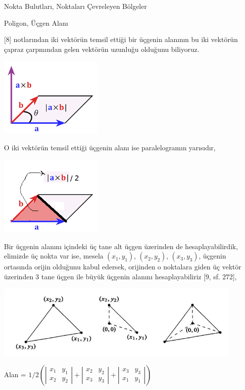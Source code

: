 \documentclass[12pt,fleqn]{article}\usepackage{../../common}
\begin{document}
Nokta Bulutları, Noktaları Çevreleyen Bölgeler

Poligon, Üçgen Alanı

[8] notlarından iki vektörün temsil ettiği bir üçgenin alanının bu iki vektörün
çapraz çarpmından gelen vektörün uzunluğu olduğunu biliyoruz. 

\includegraphics[width=5cm]{triar4.png}

O iki vektörün temsil ettiği üçgenin alanı ise paralelogramın yarısıdır,

\includegraphics[width=5cm]{triar3.png}

Bir üçgenin alanını içindeki üç tane alt üçgen üzerinden de hesaplayabilirdik,
elimizde üç nokta var ise, mesela $(x_1,y_1)$, $(x_2,y_2)$, $(x_3,y_3)$, üçgenin
ortasında orijin olduğunu kabul edersek, orijinden o noktalara giden üç vektör
üzerinden 3 tane üçgen ile büyük üçgenin alanını hesaplayabiliriz [9, sf. 272],

\includegraphics[width=12cm]{triar5.jpg}

Alan = $1/2 \left( 
\left|\begin{array}{cc}
x_1 & y_1 \\ x_2 & y_2 
\end{array}\right| + 
\left|\begin{array}{cc}
x_2 & y_2 \\ x_3 & y_3 
\end{array}\right| + 
\left|\begin{array}{cc}
x_3 & y_3 \\ x_1 & y_1
\end{array}\right| \right)
$
\end{document}
